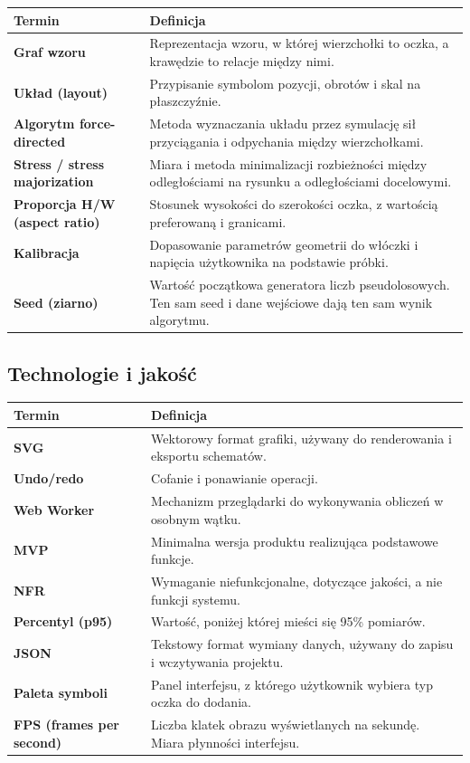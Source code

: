 \documentclass[a4paper,11pt]{article}
\begin{document}
\begin{tabularx}{0.95\textwidth}{|p{5cm}|X|}
  \hline
  \textbf{Termin} & \textbf{Definicja} \\
  \hline
  \textbf{Graf wzoru} & Reprezentacja wzoru, w której wierzchołki to oczka, a krawędzie to relacje między nimi. \\
  \hline
  \textbf{Układ (layout)} & Przypisanie symbolom pozycji, obrotów i skal na płaszczyźnie. \\
  \hline
  \textbf{Algorytm force-directed} & Metoda wyznaczania układu przez symulację sił przyciągania i odpychania między wierzchołkami. \\
  \hline
  \textbf{Stress / stress majorization} & Miara i metoda minimalizacji rozbieżności między odległościami na rysunku a odległościami docelowymi. \\
  \hline
  \textbf{Proporcja H/W (aspect ratio)} & Stosunek wysokości do szerokości oczka, z wartością preferowaną i granicami. \\
  \hline
  \textbf{Kalibracja} & Dopasowanie parametrów geometrii do włóczki i napięcia użytkownika na podstawie próbki. \\
  \hline
  \textbf{Seed (ziarno)} & Wartość początkowa generatora liczb pseudolosowych. Ten sam seed i dane wejściowe dają ten sam wynik algorytmu. \\
  \hline
\end{tabularx}

\subsection{Technologie i jakość}

\begin{tabularx}{0.95\textwidth}{|p{5cm}|X|}
  \hline
  \textbf{Termin} & \textbf{Definicja} \\
  \hline
  \textbf{SVG} & Wektorowy format grafiki, używany do renderowania i eksportu schematów. \\
  \hline
  \textbf{Undo/redo} & Cofanie i ponawianie operacji. \\
  \hline
  \textbf{Web Worker} & Mechanizm przeglądarki do wykonywania obliczeń w osobnym wątku. \\
  \hline
  \textbf{MVP} & Minimalna wersja produktu realizująca podstawowe funkcje. \\
  \hline
  \textbf{NFR} & Wymaganie niefunkcjonalne, dotyczące jakości, a nie funkcji systemu. \\
  \hline
  \textbf{Percentyl (p95)} & Wartość, poniżej której mieści się 95\% pomiarów. \\
  \hline
  \textbf{JSON} & Tekstowy format wymiany danych, używany do zapisu i wczytywania projektu. \\
  \hline
  \textbf{Paleta symboli} & Panel interfejsu, z którego użytkownik wybiera typ oczka do dodania. \\
  \hline
  \textbf{FPS (frames per second)} & Liczba klatek obrazu wyświetlanych na sekundę. Miara płynności interfejsu. \\
  \hline
\end{tabularx}
\end{document}
